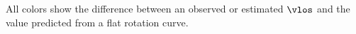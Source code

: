 \label{fig:maser_pie}
All colors show the difference between an observed or estimated $\vlos$ and the value predicted from a flat rotation curve.
